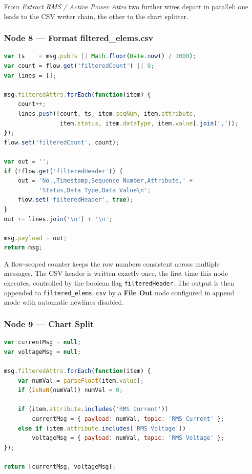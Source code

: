 \documentclass[a4paper,11pt]{article}
\begin{document}
From \textit{Extract RMS / Active Power Attrs} two further wires depart in parallel: one leads to the CSV writer chain, the other to the chart splitter.

\subsubsection*{Node 8 — Format filtered\_elems.csv}

\begin{lstlisting}[language=JavaScript, caption={Format filtered\_elems.csv -- function node.}]
var ts    = msg.pubTs || Math.floor(Date.now() / 1000);
var count = flow.get('filteredCount') || 0;
var lines = [];

msg.filteredAttrs.forEach(function(item) {
    count++;
    lines.push([count, ts, item.seqNum, item.attribute,
                item.status, item.dataType, item.value].join(','));
});
flow.set('filteredCount', count);

var out = '';
if (!flow.get('filteredHeader')) {
    out = 'No.,Timestamp,Sequence Number,Attribute,' +
          'Status,Data Type,Data Value\n';
    flow.set('filteredHeader', true);
}
out += lines.join('\n') + '\n';

msg.payload = out;
return msg;
\end{lstlisting}

A flow-scoped counter keeps the row numbers consistent across multiple messages. The CSV header is written exactly once, the first time this node executes, controlled by the boolean flag \texttt{filteredHeader}. The output is then appended to \texttt{filtered\_elems.csv} by a \textbf{File Out} node configured in append mode with automatic newlines disabled.

\subsubsection*{Node 9 — Chart Split}

\begin{lstlisting}[language=JavaScript, caption={Chart Split -- function node (2 outputs).}]
var currentMsg = null;
var voltageMsg = null;

msg.filteredAttrs.forEach(function(item) {
    var numVal = parseFloat(item.value);
    if (isNaN(numVal)) numVal = 0;

    if (item.attribute.includes('RMS Current'))
        currentMsg = { payload: numVal, topic: 'RMS Current' };
    else if (item.attribute.includes('RMS Voltage'))
        voltageMsg = { payload: numVal, topic: 'RMS Voltage' };
});

return [currentMsg, voltageMsg];
\end{lstlisting}
\end{document}
